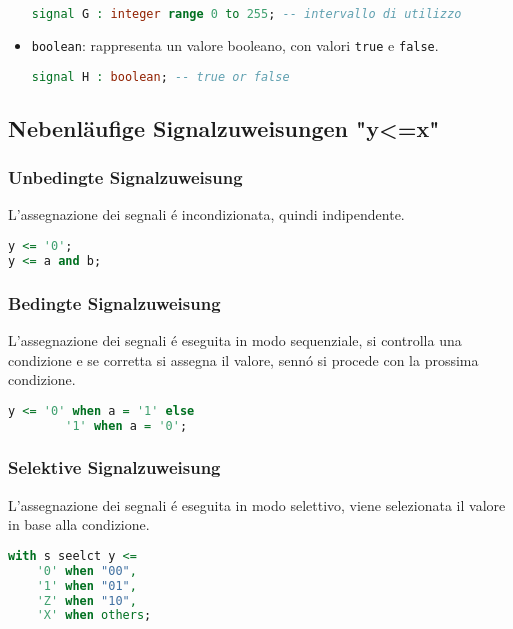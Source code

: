 \begin{itemize}
            \begin{lstlisting}[language=VHDL]
signal G : integer range 0 to 255; -- intervallo di utilizzo
            \end{lstlisting}
            \item \texttt{boolean}: rappresenta un valore booleano, con valori \texttt{true} e \texttt{false}.
            \begin{lstlisting}[language=VHDL]
signal H : boolean; -- true or false
            \end{lstlisting}
        \end{itemize}
        
    \subsection{Nebenläufige Signalzuweisungen "y<=x"}
    
        \subsubsection{Unbedingte Signalzuweisung}
            L'assegnazione dei segnali é incondizionata, quindi indipendente.
            \begin{lstlisting}[language=VHDL]
y <= '0';
y <= a and b;
            \end{lstlisting}
    
        \subsubsection{Bedingte Signalzuweisung}
            L'assegnazione dei segnali é eseguita in modo sequenziale, si controlla una condizione e se corretta si assegna il valore, sennó si procede con la prossima condizione.
            \begin{lstlisting}[language=VHDL]
y <= '0' when a = '1' else 
        '1' when a = '0';
            \end{lstlisting}
    
        \subsubsection{Selektive Signalzuweisung}
            L'assegnazione dei segnali é eseguita in modo selettivo, viene selezionata il valore in base alla condizione.
            \begin{lstlisting}[language=VHDL]
with s seelct y <=
    '0' when "00",
    '1' when "01",
    'Z' when "10",
    'X' when others;
            \end{lstlisting}
    
